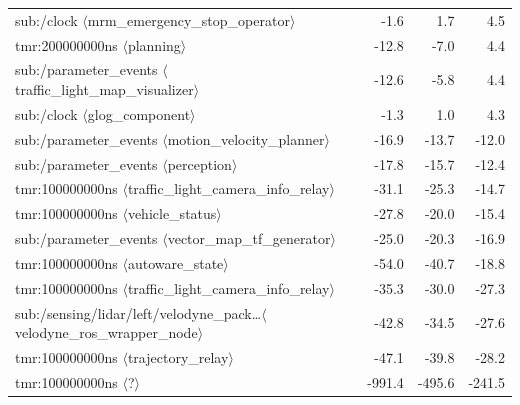 \begin{table}[t]
\begin{tabular}{llrrr}
sub:/clock $\langle$mrm\_emergency\_stop\_operator$\rangle$ &  & -1.6 & 1.7 & 4.5 \\
tmr:200000000ns $\langle$planning$\rangle$ &  & -12.8 & -7.0 & 4.4 \\
sub:/parameter\_events $\langle$traffic\_light\_map\_visualizer$\rangle$ &  & -12.6 & -5.8 & 4.4 \\
sub:/clock $\langle$glog\_component$\rangle$ &  & -1.3 & 1.0 & 4.3 \\
\midrule
sub:/parameter\_events $\langle$motion\_velocity\_planner$\rangle$ &  & -16.9 & -13.7 & -12.0 \\
sub:/parameter\_events $\langle$perception$\rangle$ &  & -17.8 & -15.7 & -12.4 \\
tmr:100000000ns $\langle$traffic\_light\_camera\_info\_relay$\rangle$ &  & -31.1 & -25.3 & -14.7 \\
tmr:100000000ns $\langle$vehicle\_status$\rangle$ &  & -27.8 & -20.0 & -15.4 \\
sub:/parameter\_events $\langle$vector\_map\_tf\_generator$\rangle$ &  & -25.0 & -20.3 & -16.9 \\
tmr:100000000ns $\langle$autoware\_state$\rangle$ &  & -54.0 & -40.7 & -18.8 \\
tmr:100000000ns $\langle$traffic\_light\_camera\_info\_relay$\rangle$ &  & -35.3 & -30.0 & -27.3 \\
sub:/sensing/lidar/left/velodyne\_pack\dots $\langle$velodyne\_ros\_wrapper\_node$\rangle$ &  & -42.8 & -34.5 & -27.6 \\
tmr:100000000ns $\langle$trajectory\_relay$\rangle$ &  & -47.1 & -39.8 & -28.2 \\
tmr:100000000ns $\langle$?$\rangle$ &  & -991.4 & -495.6 & -241.5 \\
\bottomrule
\end{tabular}
\end{table}
